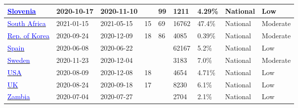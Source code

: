 \begin{table}[!ht]
\begin{center}
\begin{tabular}{p{2cm} | p{1.6cm} | p{1.6cm} | p{0.8cm} | p{0.8cm} | p{1cm} | p{1.3cm} | p{1.2cm} | p{1.2cm}}
\hline 
\href{https://dx.doi.org/10.1016/j.cmi.2021.03.009}{\textcolor{blue}{Slovenia}} & 2020-10-17 & 2020-11-10 &  & 99 & 1211 & 4.29\% & National & Low \\ 
\hline 
\href{https://assets.researchsquare.com/files/rs-690372/v2\_covered.pdf?c=1627923426}{\textcolor{blue}{South Africa}} & 2021-01-15 & 2021-05-15 & 15 & 69 & 16762 & 47.4\% & National & Moderate \\ 
\hline 
\href{https://bmjopen.bmj.com/content/11/4/e049837.abstract}{\textcolor{blue}{Rep. of Korea}} & 2020-09-24 & 2020-12-09 & 18 & 86 & 4085 & 0.39\% & National & Moderate \\ 
\hline 
\href{https://www.mscbs.gob.es/ciudadanos/ene-covid/docs/ESTUDIO\_ENE-COVID19\_INFORME\_FINAL.pdf}{\textcolor{blue}{Spain}} & 2020-06-08 & 2020-06-22 &  &  & 62167 & 5.2\% & National & Low \\ 
\hline 
\href{https://www.folkhalsomyndigheten.se/contentassets/376f9021a4c84da08de18ac597284f0c/pavisning-antikroppar-genomgangen-covid-19-blodgivare-delrapport-2.pdf}{\textcolor{blue}{Sweden}} & 2020-11-23 & 2020-12-04 &  &  & 3183 & 7.0\% & National & Moderate \\ 
\hline 
\href{https://dx.doi.org/10.1093/cid/ciab626}{\textcolor{blue}{USA}} & 2020-08-09 & 2020-12-08 & 18 &  & 4654 & 4.71\% & National & Low \\ 
\hline 
\href{https://www.gov.uk/government/publications/national-covid-19-surveillance-reports}{\textcolor{blue}{UK}} & 2020-08-24 & 2020-09-18 & 17 &  & 8230 & 6.1\% & National & Low \\ 
\hline 
\href{https://www.thelancet.com/journals/langlo/article/PIIS2214-109X(21)00053-X/fulltext}{\textcolor{blue}{Zambia}} & 2020-07-04 & 2020-07-27 &  &  & 2704 & 2.1\% & National & Low \\ 
\hline 


    \end{tabular}
    \end{center}
\end{table}